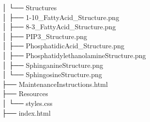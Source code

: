\documentclass[
  letterpaper,
  DIV=11,
  numbers=noendperiod]{scrartcl}
\begin{document}
\begin{tcolorbox}
│ └── Structures\\
│ ├── 1-10\_FattyAcid\_Structure.png\\
│ ├── 8-3\_FattyAcid\_Structure.png\\
│ ├── PIP3\_Structure.png\\
│ ├── PhosphatidicAcid\_Structure.png\\
│ ├── PhosphatidylethanolamineStructure.png\\
│ ├── SphinganineStructure.png\\
│ └── SphingosineStructure.png\\
├── MaintenanceInstructions.html\\
├── Resources\\
│ └── styles.css\\
├── index.html

\end{tcolorbox}
\end{document}
